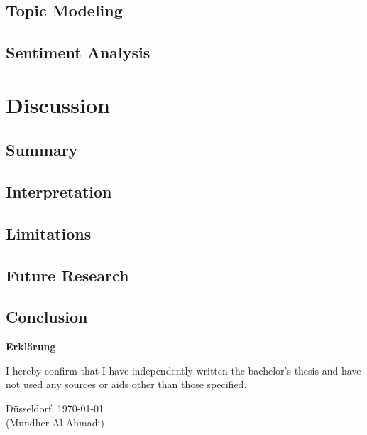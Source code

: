 \documentclass[12pt,english,titlepage,a4paper]{article}
\begin{document}
\subsection{Topic Modeling}
\subsection{Sentiment Analysis}


\section{Discussion}
\subsection{Summary}
\subsection{Interpretation}
\subsection{Limitations}
\subsection{Future Research}
\subsection{Conclusion}


\pagebreak





\pagebreak\noindent
\textbf{\LARGE Erkl\"arung}

\bigskip\bigskip
\noindent 
I hereby confirm that I have independently written the 
bachelor's thesis and have not used any sources or aids 
other than those specified.
\bigskip
\noindent

\bigskip\bigskip\bigskip
\noindent
D\"usseldorf, \today \\
(Mundher Al-Ahmadi)

% 
\end{document}
